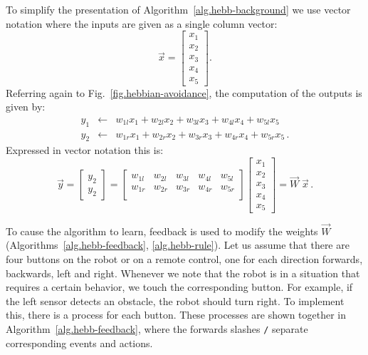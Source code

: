 To simplify the presentation of Algorithm~\ref{alg.hebb-background} we use vector notation where the inputs are given as a single column vector:
\[
\vec{x} = \left[ \begin{array}{c} x_1\\x_2\\x_3\\x_4\\x_5 \end{array} \right].
\]
Referring again to Fig.~\ref{fig.hebbian-avoidance}, the computation of the outputs is given by:
\begin{eqnarray}
y_1 & \leftarrow & w_{1l}x_1 + w_{2l}x_2 + w_{3l}x_3 + w_{4l}x_4 + w_{5l}x_5\label{eqn.yl}\\
y_2 & \leftarrow & w_{1r}x_1 + w_{2r}x_2 + w_{3r}x_3 + w_{4r}x_4 + w_{5r}x_5\label{eqn.yr}\,.
\end{eqnarray}
Expressed in vector notation this is:
\begin{equation}\label{eqn.hebbian}
\vec{y} =
\left[ \begin{array}{c} y_2\\y_2 \end{array} \right] =
\left[
  \begin{array}{ccccc}
    w_{1l} & w_{2l} & w_{3l} & w_{4l} & w_{5l} \\
    w_{1r} & w_{2r} & w_{3r} & w_{4r} & w_{5r} \\
\end{array}
\right]
\left[ \begin{array}{c} x_1\\x_2\\x_3\\x_4\\x_5 \end{array} \right] =
\vec{W}\;\vec{x}\,.
\end{equation}

To cause the algorithm to learn, feedback is used to modify the weights $\vec{W}$ (Algorithms~\ref{alg.hebb-feedback}, \ref{alg.hebb-rule}). Let us assume that there are four buttons on the robot or on a remote control, one for each direction forwards, backwards, left and right. Whenever we note that the robot is in a situation that requires a certain behavior, we touch the corresponding button. For example, if the left sensor detects an obstacle, the robot should turn right. To implement this, there is a process for each button. These processes are shown together in Algorithm~\ref{alg.hebb-feedback}, where the forwards slashes \verb+/+ separate corresponding events and actions.

